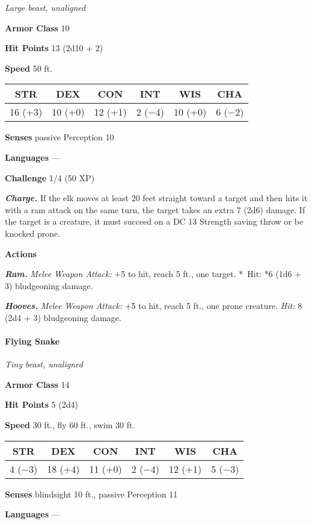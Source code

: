 \documentclass[
]{article}
\begin{document}
\emph{Large beast, unaligned}

\textbf{Armor Class} 10

\textbf{Hit Points} 13 (2d10 + 2)

\textbf{Speed} 50 ft.

\begin{longtable}[]{@{}cccccc@{}}
\toprule
STR & DEX & CON & INT & WIS & CHA\tabularnewline
\midrule
\endhead
16 (+3) & 10 (+0) & 12 (+1) & 2 (−4) & 10 (+0) & 6 (−2)\tabularnewline
\bottomrule
\end{longtable}

\textbf{Senses} passive Perception 10

\textbf{Languages} ---

\textbf{Challenge} 1/4 (50 XP)

\emph{\textbf{Charge.}} If the elk moves at least 20 feet straight
toward a target and then hits it with a ram attack on the same turn, the
target takes an extra 7 (2d6) damage. If the target is a creature, it
must succeed on a DC 13 Strength saving throw or be knocked prone.

\textbf{Actions}

\emph{\textbf{Ram.}} \emph{Melee Weapon Attack:} +5 to hit, reach 5 ft.,
one target. *~Hit: *6 (1d6 + 3) bludgeoning damage.

\emph{\textbf{Hooves.}} \emph{Melee Weapon Attack:} +5 to hit, reach 5
ft., one prone creature. \emph{Hit:} 8 (2d4 + 3) bludgeoning damage.

\hypertarget{flying-snake}{%
\paragraph{Flying Snake}\label{flying-snake}}

\emph{Tiny beast, unaligned}

\textbf{Armor Class} 14

\textbf{Hit Points} 5 (2d4)

\textbf{Speed} 30 ft., fly 60 ft., swim 30 ft.

\begin{longtable}[]{@{}cccccc@{}}
\toprule
STR & DEX & CON & INT & WIS & CHA\tabularnewline
\midrule
\endhead
4 (−3) & 18 (+4) & 11 (+0) & 2 (−4) & 12 (+1) & 5 (−3)\tabularnewline
\bottomrule
\end{longtable}

\textbf{Senses} blindsight 10 ft., passive Perception 11

\textbf{Languages} ---
\end{document}

